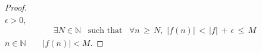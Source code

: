 \begin{theorem}
\begin{proof}
\begin{align*}
        \end{align*}
         $\epsilon > 0,$ 
        \begin{align*}
            \exists N \in \mathbb{N} \hspace{10pt} \text{such that} \hspace{10pt} \forall n \hspace{2pt} \geq \hspace{2pt} N, \hspace{4pt}  \lvert f(n) \rvert \hspace{2pt} < \hspace{2pt} \lvert f \rvert \hspace{2pt} + \hspace{2pt} \epsilon \hspace{2pt} \leq \hspace{2pt} M
        \end{align*}
         $n \in \mathbb{N} \hspace{10pt}$  $\hspace{10pt} \lvert f(n) \rvert < M$.
    \end{proof}
\end{theorem}

